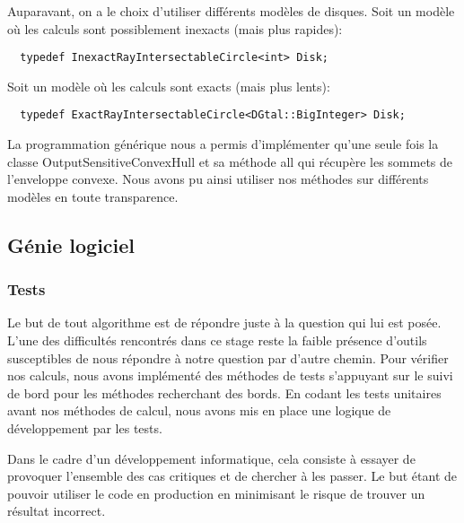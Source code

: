 Auparavant, on a le choix d'utiliser différents modèles de disques. 
Soit un modèle où les calculs sont possiblement inexacts (mais plus rapides): 
\begin{verbatim}
  typedef InexactRayIntersectableCircle<int> Disk;
\end{verbatim}
Soit un modèle où les calculs sont exacts (mais plus lents):
\begin{verbatim}
  typedef ExactRayIntersectableCircle<DGtal::BigInteger> Disk;
\end{verbatim}

La programmation générique nous a permis d'implémenter qu'une seule fois la classe OutputSensitiveConvexHull et sa méthode all qui récupère les sommets de l'enveloppe convexe. Nous avons pu ainsi utiliser nos méthodes sur différents modèles en toute transparence. 

\subsection{Génie logiciel}

\subsubsection{Tests}

Le but de tout algorithme est de répondre juste à la question qui lui est posée. L'une des difficultés rencontrés dans ce stage reste la faible présence d'outils susceptibles de nous répondre à notre question par d'autre chemin. Pour vérifier nos calculs, nous avons implémenté des méthodes de tests s'appuyant sur le suivi de bord pour les méthodes recherchant des bords. En codant les tests unitaires avant nos méthodes de calcul, nous avons mis en place une logique de développement par les tests. 

Dans le cadre d'un développement informatique, cela consiste à essayer de provoquer l'ensemble des cas critiques et de chercher à les passer. Le but étant de pouvoir utiliser le code en production en minimisant le risque de trouver un résultat incorrect.\\

